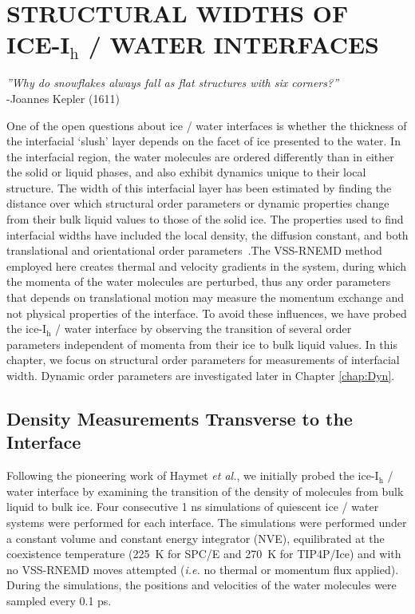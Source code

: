 
\chapter{STRUCTURAL WIDTHS OF ICE-I$_\mathrm{h}$ / WATER
  INTERFACES}\label{chap:Str}


\begin{flushright}
\textit{''Why do snowflakes always fall as flat structures with six corners?''} \\
-Joannes Kepler (1611) \\
\end{flushright}

One of the open questions about ice / water interfaces is whether the
thickness of the interfacial `slush' layer depends on the facet of ice
presented to the water. In the interfacial region, the water molecules
are ordered differently than in either the solid or liquid phases, and
also exhibit dynamics unique to their local structure.  The width of
this interfacial layer has been estimated by finding the distance over
which structural order parameters or dynamic properties change from
their bulk liquid values to those of the solid ice. The properties
used to find interfacial widths have included the local density, the
diffusion constant, and both translational and orientational order
parameters~\cite{Karim1988,Karim1990,Hayward2001,Hayward2002,Bryk2002,Gay2002,Louden2013a}.The
VSS-RNEMD method employed here creates thermal and velocity gradients
in the system, during which the momenta of the water molecules are
perturbed, thus any order parameters that depends on translational
motion may measure the momentum exchange and not physical properties
of the interface. To avoid these influences, we have probed the
ice-I$_\mathrm{h}$ / water interface by observing the transition of
several order parameters independent of momenta from their ice to bulk
liquid values.  In this chapter, we focus on structural order
parameters for measurements of interfacial width. Dynamic order
parameters are investigated later in Chapter \ref{chap:Dyn}.

\section{Density Measurements Transverse to the Interface}
Following the pioneering work of Haymet \textit{et al.}, we initially
probed the ice-I$_\mathrm{h}$ / water interface by examining the
transition of the density of molecules from bulk liquid to bulk
ice.\cite{Karim1987,Karim1990,Hayward2001,Bryk2004} Four consecutive 1
ns simulations of quiescent ice / water systems were performed for
each interface. The simulations were performed under a constant volume
and constant energy integrator (NVE), equilibrated at the coexistence
temperature (225~K for SPC/E and 270~K for TIP4P/Ice) and with no
VSS-RNEMD moves attempted (\textit{i.e.} no thermal or momentum flux
applied). During the simulations, the positions and velocities of the
water molecules were sampled every 0.1 ps.

